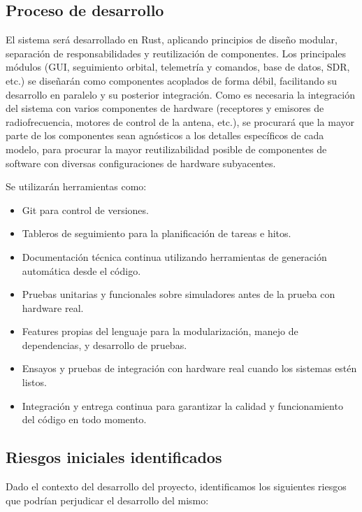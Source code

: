 \subsection*{Proceso de desarrollo}

El sistema será desarrollado en Rust, aplicando principios de diseño modular, separación de responsabilidades y reutilización de componentes. Los principales módulos (GUI, seguimiento orbital, telemetría y comandos, base de datos, SDR, etc.) se diseñarán como componentes acoplados de forma débil, facilitando su desarrollo en paralelo y su posterior integración. Como es necesaria la integración del sistema con varios componentes de hardware (receptores y emisores de radiofrecuencia, motores de control de la antena, etc.), se procurará que la mayor parte de los componentes sean agnósticos a los detalles específicos de cada modelo, para procurar la mayor reutilizabilidad posible de componentes de software con diversas configuraciones de hardware subyacentes.

Se utilizarán herramientas como:

\begin{itemize}
    \item Git para control de versiones.
    \item Tableros de seguimiento para la planificación de tareas e hitos.
    \item Documentación técnica continua utilizando herramientas de generación automática desde el código.
    \item Pruebas unitarias y funcionales sobre simuladores antes de la prueba con hardware real.
    \item Features propias del lenguaje para la modularización, manejo de dependencias, y desarrollo de pruebas.
    \item Ensayos y pruebas de integración con hardware real cuando los sistemas estén listos.
    \item Integración y entrega continua para garantizar la calidad y funcionamiento del código en todo momento.
\end{itemize}

\subsection*{Riesgos iniciales identificados}

Dado el contexto del desarrollo del proyecto, identificamos los siguientes riesgos que podrían perjudicar el desarrollo del mismo:

